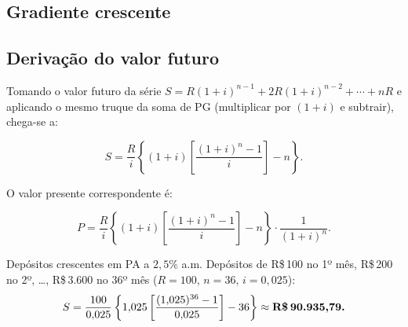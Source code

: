 \subsection{Gradiente crescente}

\begin{center}
\end{center}

\subsection*{Derivação do valor futuro}

Tomando o valor futuro da série $S = R(1+i)^{n-1} + 2R(1+i)^{n-2} + \cdots + nR$ e aplicando o mesmo truque da soma de PG (multiplicar por $(1+i)$ e subtrair), chega-se a:

\begin{resultado}
\[
  S = \frac{R}{i}\left\{(1+i)\left[\frac{(1+i)^n-1}{i}\right] - n\right\}.
\]
\end{resultado}

O valor presente correspondente é:
\begin{resultado}
\[
  P = \frac{R}{i}\left\{(1+i)\left[\frac{(1+i)^n-1}{i}\right] - n\right\}
      \cdot\frac{1}{(1+i)^n}.
\]
\end{resultado}

\begin{exemplo}{Depósitos crescentes em PA a $2{,}5\%$ a.m.}
Depósitos de R\$\,100 no 1º mês, R\$\,200 no 2º, \ldots, R\$\,3.600 no 36º mês ($R = 100$, $n = 36$, $i = 0{,}025$):
\[
  S = \frac{100}{0{,}025}\left\{1{,}025\left[\frac{(1{,}025)^{36}-1}{0{,}025}\right]-36\right\}
    \approx \textbf{R\$\,90.935{,}79.}
\]
\end{exemplo}

